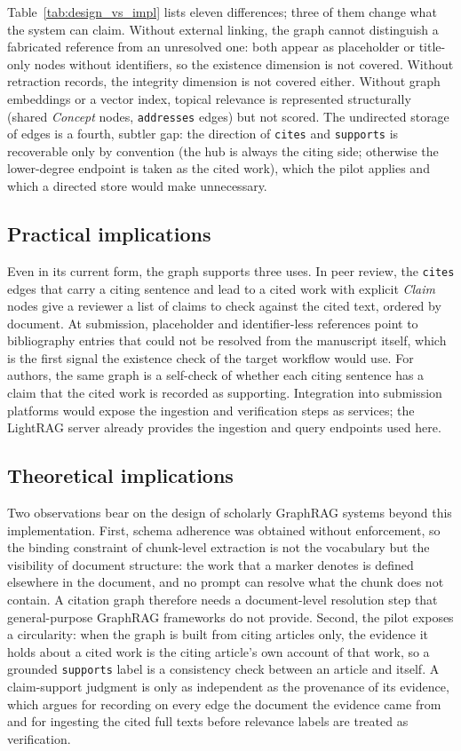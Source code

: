 \documentclass[lettersize,journal]{IEEEtran}
\begin{document}
Table~\ref{tab:design_vs_impl} lists eleven differences; three of them change what the system can claim. Without external linking, the graph cannot distinguish a fabricated reference from an unresolved one: both appear as placeholder or title-only nodes without identifiers, so the existence dimension is not covered. Without retraction records, the integrity dimension is not covered either. Without graph embeddings or a vector index, topical relevance is represented structurally (shared \emph{Concept} nodes, \texttt{addresses} edges) but not scored. The undirected storage of edges is a fourth, subtler gap: the direction of \texttt{cites} and \texttt{supports} is recoverable only by convention (the hub is always the citing side; otherwise the lower-degree endpoint is taken as the cited work), which the pilot applies and which a directed store would make unnecessary.

\subsection{Practical implications}

Even in its current form, the graph supports three uses. In peer review, the \texttt{cites} edges that carry a citing sentence and lead to a cited work with explicit \emph{Claim} nodes give a reviewer a list of claims to check against the cited text, ordered by document. At submission, placeholder and identifier-less references point to bibliography entries that could not be resolved from the manuscript itself, which is the first signal the existence check of the target workflow would use. For authors, the same graph is a self-check of whether each citing sentence has a claim that the cited work is recorded as supporting. Integration into submission platforms would expose the ingestion and verification steps as services; the LightRAG server already provides the ingestion and query endpoints used here.

\subsection{Theoretical implications}

Two observations bear on the design of scholarly GraphRAG systems beyond this implementation. First, schema adherence was obtained without enforcement, so the binding constraint of chunk-level extraction is not the vocabulary but the visibility of document structure: the work that a marker denotes is defined elsewhere in the document, and no prompt can resolve what the chunk does not contain. A citation graph therefore needs a document-level resolution step that general-purpose GraphRAG frameworks do not provide. Second, the pilot exposes a circularity: when the graph is built from citing articles only, the evidence it holds about a cited work is the citing article's own account of that work, so a grounded \texttt{supports} label is a consistency check between an article and itself. A claim-support judgment is only as independent as the provenance of its evidence, which argues for recording on every edge the document the evidence came from and for ingesting the cited full texts before relevance labels are treated as verification.
\end{document}
